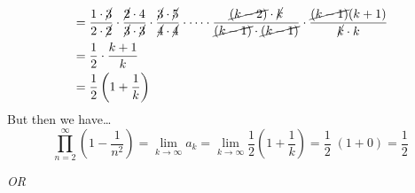\documentclass[11pt,letterpaper]{article}
\begin{document}
\begin{enumerate}
\[\begin{aligned}
	&= \dfrac{1 \cdot \cancel{3}}{2 \cdot \cancel{2}} \cdot \dfrac{\cancel{2} \cdot 4}{\cancel{3} \cdot \cancel{3}} \cdot \dfrac{\cancel{3} \cdot \cancel{5}}{\cancel{4} \cdot \cancel{4}} \cdot \cdots \cdot \dfrac{\cancel{(k - 2)} \cdot \cancel{k}}{\cancel{(k -1)} \cdot \cancel{(k - 1)}} \cdot \dfrac{\cancel{(k - 1)}(k + 1)}{\cancel{k} \cdot k} \\	
	&= \dfrac{1}{2} \cdot \dfrac{k + 1}{k} \\
	&= \dfrac{1}{2} \left(1 + \dfrac{1}{k} \right)
	\end{aligned}
	\]
But then we have\dots
	\[
	\prod_{n=2}^\infty \left(1 - \dfrac{1}{n^2} \right)= \lim_{k \to \infty} a_k= \lim_{k \to \infty} \dfrac{1}{2} \left(1 + \dfrac{1}{k} \right)= \dfrac{1}{2}\; (1 + 0)= \dfrac{1}{2}
	\]

	\begin{center} {\itshape OR} \end{center}


\end{enumerate}
\end{document}
